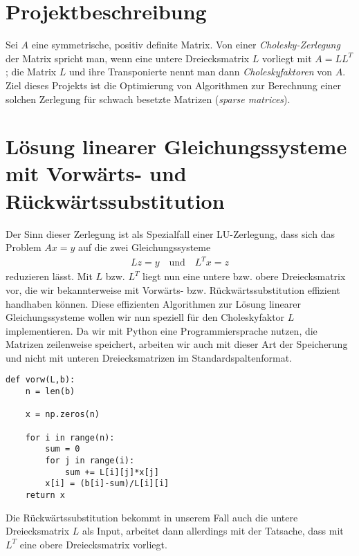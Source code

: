 \tableofcontents{}
\newpage

\section{Projektbeschreibung}

Sei $A$ eine symmetrische, positiv definite Matrix. Von einer \textit{Cholesky-Zerlegung} der Matrix spricht man, wenn eine untere Dreiecksmatrix
$L$ vorliegt mit $A = LL^{T}$; die Matrix $L$ und ihre Transponierte nennt man dann \textit{Choleskyfaktoren} von $A$. Ziel dieses Projekts ist die Optimierung von Algorithmen zur Berechnung einer solchen Zerlegung für schwach besetzte Matrizen (\textit{sparse matrices}).
\newline

\section{Lösung linearer Gleichungssysteme mit Vorwärts- und Rückwärtssubstitution}

Der Sinn dieser Zerlegung ist als Spezialfall einer LU-Zerlegung, dass sich das Problem $Ax=y$ auf die zwei Gleichungssysteme
\begin{align*}
    Lz = y \text{~~~und~~~} L^{T}x=z
\end{align*}
reduzieren lässt. Mit $L$ bzw. $L^{T}$ liegt nun eine untere bzw. obere Dreiecksmatrix vor, die wir bekannterweise mit Vorwärts- bzw. Rückwärtssubstitution effizient handhaben können.
Diese effizienten Algorithmen zur Lösung linearer Gleichungssysteme wollen wir nun speziell für den Choleskyfaktor $L$ implementieren. Da wir mit Python eine Programmiersprache nutzen, die Matrizen zeilenweise speichert, arbeiten wir auch mit dieser Art der Speicherung und nicht mit unteren Dreiecksmatrizen im Standardspaltenformat.

\lstset{language=Python}
\lstset{frame=lines}
\lstset{basicstyle=\footnotesize}
\begin{lstlisting}
def vorw(L,b):
    n = len(b)

    x = np.zeros(n)

    for i in range(n):
        sum = 0
        for j in range(i):
            sum += L[i][j]*x[j]
        x[i] = (b[i]-sum)/L[i][i]
    return x
\end{lstlisting}

Die Rückwärtssubstitution bekommt in unserem Fall auch die untere Dreiecksmatrix $L$ als Input, arbeitet dann allerdings mit der Tatsache, dass mit $L^{T}$ eine obere Dreiecksmatrix vorliegt.

